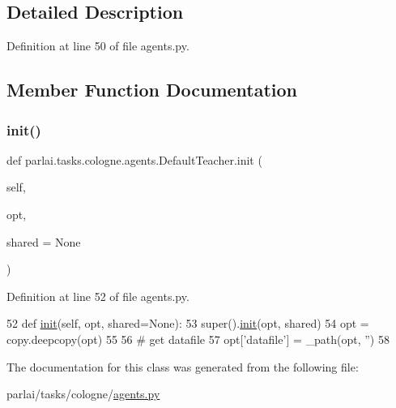 \subsection{Detailed Description}


Definition at line 50 of file agents.\+py.



\subsection{Member Function Documentation}
\mbox{\label{classparlai_1_1tasks_1_1cologne_1_1agents_1_1DefaultTeacher_a513244cd35eaa8c12576fb78bd283689}} 
\subsubsection{\texorpdfstring{init()}{init()}}
{\footnotesize\ttfamily def parlai.\+tasks.\+cologne.\+agents.\+Default\+Teacher.\+init (\begin{DoxyParamCaption}\item[{}]{self,  }\item[{}]{opt,  }\item[{}]{shared = {\ttfamily None} }\end{DoxyParamCaption})}



Definition at line 52 of file agents.\+py.


\begin{DoxyCode}
52     \textcolor{keyword}{def }\hyperlink{namespaceparlai_1_1agents_1_1tfidf__retriever_1_1build__tfidf_a297d8a6b3ed43b31feccf5707517fee3}{init}(self, opt, shared=None):
53         super().\hyperlink{namespaceparlai_1_1agents_1_1tfidf__retriever_1_1build__tfidf_a297d8a6b3ed43b31feccf5707517fee3}{init}(opt, shared)
54         opt = copy.deepcopy(opt)
55 
56         \textcolor{comment}{# get datafile}
57         opt[\textcolor{stringliteral}{'datafile'}] = \_path(opt, \textcolor{stringliteral}{''})
58 \end{DoxyCode}


The documentation for this class was generated from the following file\+:\begin{DoxyCompactItemize}
\item 
parlai/tasks/cologne/\hyperlink{parlai_2tasks_2cologne_2agents_8py}{agents.\+py}\end{DoxyCompactItemize}
